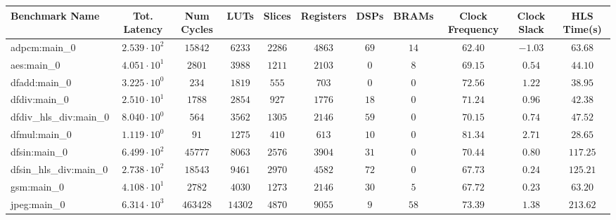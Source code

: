 \begin{tabular}{|l|c|c|c|c|c|c|c|c|c|c|}
\hline
Benchmark Name          & Tot. Latency           & Num Cycles & LUTs      & Slices    & Registers & DSPs    & BRAMs   & Clock Frequency & Clock Slack & HLS Time(s) \\
\hline
adpcm:main\_0           & $ 2.539 \cdot 10^{2} $ & $ 15842  $ & $ 6233  $ & $ 2286  $ & $ 4863  $ & $ 69  $ & $ 14  $ & $ 62.40       $ & $ -1.03   $ & $ 63.68   $ \\
aes:main\_0             & $ 4.051 \cdot 10^{1} $ & $ 2801   $ & $ 3988  $ & $ 1211  $ & $ 2103  $ & $ 0   $ & $ 8   $ & $ 69.15       $ & $ 0.54    $ & $ 44.10   $ \\
dfadd:main\_0           & $ 3.225 \cdot 10^{0} $ & $ 234    $ & $ 1819  $ & $ 555   $ & $ 703   $ & $ 0   $ & $ 0   $ & $ 72.56       $ & $ 1.22    $ & $ 38.95   $ \\
dfdiv:main\_0           & $ 2.510 \cdot 10^{1} $ & $ 1788   $ & $ 2854  $ & $ 927   $ & $ 1776  $ & $ 18  $ & $ 0   $ & $ 71.24       $ & $ 0.96    $ & $ 42.38   $ \\
dfdiv\_hls\_div:main\_0 & $ 8.040 \cdot 10^{0} $ & $ 564    $ & $ 3562  $ & $ 1305  $ & $ 2146  $ & $ 59  $ & $ 0   $ & $ 70.15       $ & $ 0.74    $ & $ 47.52   $ \\
dfmul:main\_0           & $ 1.119 \cdot 10^{0} $ & $ 91     $ & $ 1275  $ & $ 410   $ & $ 613   $ & $ 10  $ & $ 0   $ & $ 81.34       $ & $ 2.71    $ & $ 28.65   $ \\
dfsin:main\_0           & $ 6.499 \cdot 10^{2} $ & $ 45777  $ & $ 8063  $ & $ 2576  $ & $ 3904  $ & $ 31  $ & $ 0   $ & $ 70.44       $ & $ 0.80    $ & $ 117.25  $ \\
dfsin\_hls\_div:main\_0 & $ 2.738 \cdot 10^{2} $ & $ 18543  $ & $ 9461  $ & $ 2970  $ & $ 4582  $ & $ 72  $ & $ 0   $ & $ 67.73       $ & $ 0.24    $ & $ 125.21  $ \\
gsm:main\_0             & $ 4.108 \cdot 10^{1} $ & $ 2782   $ & $ 4030  $ & $ 1273  $ & $ 2146  $ & $ 30  $ & $ 5   $ & $ 67.72       $ & $ 0.23    $ & $ 63.20   $ \\
jpeg:main\_0            & $ 6.314 \cdot 10^{3} $ & $ 463428 $ & $ 14302 $ & $ 4870  $ & $ 9055  $ & $ 9   $ & $ 58  $ & $ 73.39       $ & $ 1.38    $ & $ 213.62  $ \\

\end{tabular}
